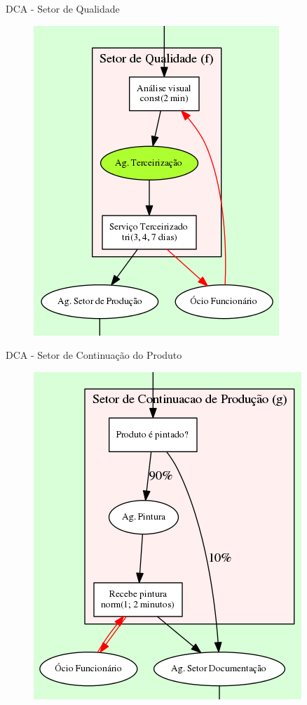 \documentclass[xcolor=dvipsnames]{beamer}
\begin{document}
\begin{frame}{DCA - Setor de Qualidade}
	\begin{figure}[H]
		\centering
		\includegraphics[height=0.865\textheight]{img/f.png}
	\end{figure}
\end{frame}
	
\begin{frame}{DCA - Setor de Continuação do Produto}
	\begin{figure}[H]
		\centering
		\includegraphics[height=0.865\textheight]{img/g.png}
	\end{figure}
\end{frame}
	
\end{document}
